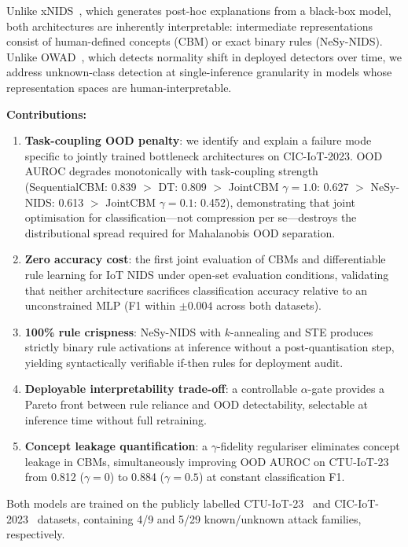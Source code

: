 \documentclass[conference]{IEEEtran}
\begin{document}
Unlike xNIDS~\cite{wei2023xnids}, which generates post-hoc
explanations from a black-box model, both architectures are inherently
interpretable: intermediate representations consist of human-defined
concepts (CBM) or exact binary rules (NeSy-NIDS). Unlike
OWAD~\cite{han2023owad}, which detects normality shift in deployed
detectors over time, we address unknown-class detection at
single-inference granularity in models whose representation spaces are
human-interpretable.

\smallskip
\noindent\textbf{Contributions:}
\begin{enumerate}
  \item \textbf{Task-coupling OOD penalty}: we identify and explain a
    failure mode specific to jointly trained bottleneck architectures on
    CIC-IoT-2023. OOD AUROC degrades monotonically with task-coupling
    strength (SequentialCBM: 0.839 $>$ DT: 0.809 $>$ JointCBM
    $\gamma{=}1.0$: 0.627 $>$ NeSy-NIDS: 0.613 $>$ JointCBM
    $\gamma{=}0.1$: 0.452), demonstrating that joint optimisation for
    classification---not compression per se---destroys the distributional
    spread required for Mahalanobis OOD separation.
  \item \textbf{Zero accuracy cost}: the first joint evaluation of CBMs
    and differentiable rule learning for IoT NIDS under open-set
    evaluation conditions, validating that neither architecture
    sacrifices classification accuracy relative to an unconstrained MLP
    (F1 within $\pm0.004$ across both datasets).
  \item \textbf{100\% rule crispness}: NeSy-NIDS with $k$-annealing
    and STE produces strictly binary rule activations at inference
    without a post-quantisation step, yielding syntactically
    verifiable if-then rules for deployment audit.
  \item \textbf{Deployable interpretability trade-off}: a controllable
    $\alpha$-gate provides a Pareto front between rule reliance and
    OOD detectability, selectable at inference time without full
    retraining.
  \item \textbf{Concept leakage quantification}: a $\gamma$-fidelity
    regulariser eliminates concept leakage in CBMs, simultaneously
    improving OOD AUROC on CTU-IoT-23 from 0.812 ($\gamma{=}0$) to
    0.884 ($\gamma{=}0.5$) at constant classification F1.
\end{enumerate}

Both models are trained on the publicly labelled CTU-IoT-23~\cite{parmisano2020ctu}
and CIC-IoT-2023~\cite{neto2023ciciot} datasets, containing
4/9 and 5/29 known/unknown attack families, respectively.
\end{document}

